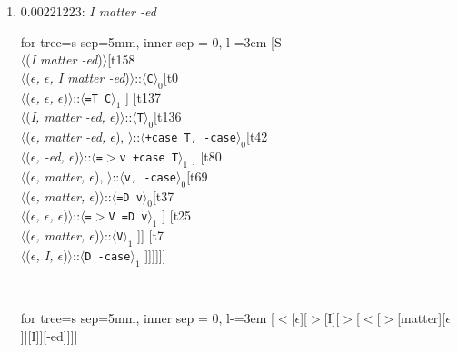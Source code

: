 \documentclass[11pt]{article}
\begin{document}
\begin{enumerate}
	\item  0.00221223: \textit{I matter -ed} \\[0.5em]
	\begin{adjustbox}{max width = \textwidth}
	\begin{forest}
	for tree={s sep=5mm, inner sep = 0, l-=3em}
	[S\\$\langle$(\textit{I matter -ed})$\rangle$[t158\\$\langle$(\textit{$\epsilon${,} $\epsilon${,} I matter -ed})$\rangle$::$\langle$\texttt{C}$\rangle_0$[t0\\$\langle$(\textit{$\epsilon${,} $\epsilon${,} $\epsilon$})$\rangle$::$\langle$\texttt{{=}T C}$\rangle_1$ ] [t137\\$\langle$(\textit{I{,} matter -ed{,} $\epsilon$})$\rangle$::$\langle$\texttt{T}$\rangle_0$[t136\\$\langle$(\textit{$\epsilon${,} matter -ed{,} $\epsilon$}){,} $\rangle$::$\langle$\texttt{+case T{,} -case}$\rangle_0$[t42\\$\langle$(\textit{$\epsilon${,} -ed{,} $\epsilon$})$\rangle$::$\langle$\texttt{{=}$>$v +case T}$\rangle_1$ ] [t80\\$\langle$(\textit{$\epsilon${,} matter{,} $\epsilon$}){,} $\rangle$::$\langle$\texttt{v{,} -case}$\rangle_0$[t69\\$\langle$(\textit{$\epsilon${,} matter{,} $\epsilon$})$\rangle$::$\langle$\texttt{{=}D v}$\rangle_0$[t37\\$\langle$(\textit{$\epsilon${,} $\epsilon${,} $\epsilon$})$\rangle$::$\langle$\texttt{{=}$>$V {=}D v}$\rangle_1$ ] [t25\\$\langle$(\textit{$\epsilon${,} matter{,} $\epsilon$})$\rangle$::$\langle$\texttt{V}$\rangle_1$ ]] [t7\\$\langle$(\textit{$\epsilon${,} I{,} $\epsilon$})$\rangle$::$\langle$\texttt{D -case}$\rangle_1$ ]]]]]]
	\end{forest}
	\end{adjustbox}
	\\
	\begin{adjustbox}{max width = \textwidth}
	\begin{forest}
	for tree={s sep=5mm, inner sep = 0, l-=3em}
	[$<$[$\epsilon$][$>$[I][$>$[$<$[$>$[matter][$\epsilon$]][I]][-ed]]]]
	\end{forest}
	\end{adjustbox}
	\newpage


\end{enumerate}
\end{document}
